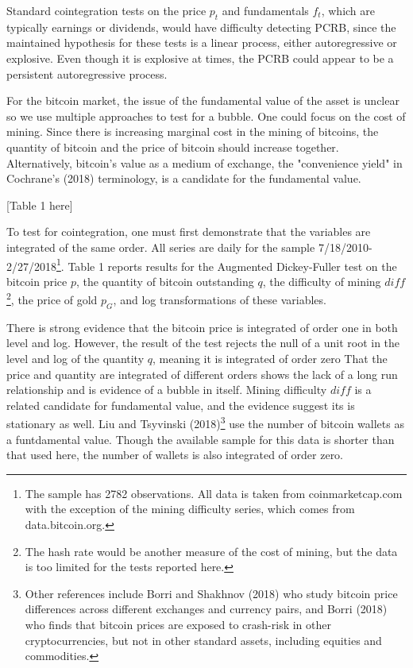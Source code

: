 \documentclass{article}
\begin{document}
Standard cointegration tests on the price $p_{t}$ and fundamentals $f_{t}$,
which are typically earnings or dividends, would have difficulty detecting
PCRB, since the maintained hypothesis for these tests is a linear process,
either autoregressive or explosive. Even though it is explosive at times,
the PCRB could appear to be a persistent autoregressive process.

For the bitcoin market, the issue of the fundamental value of the asset is
unclear so we use multiple approaches to test for a bubble. One could
focus on the cost of mining. Since there is increasing marginal cost in
the mining of bitcoins, the quantity of bitcoin and the price of bitcoin
should increase together. Alternatively, bitcoin's value as a medium of
exchange, the "convenience yield" in Cochrane's (2018) terminology, is a
candidate for the fundamental value.

\bigskip

\begin{center}
[Table 1 here]\bigskip
\end{center}

To test for cointegration, one must first demonstrate that the variables are
integrated of the same order. All series are daily for the sample
7/18/2010-2/27/2018\footnote{%
The sample has 2782 observations. All data is taken from coinmarketcap.com
with the exception of the mining difficulty series, which comes from
data.bitcoin.org.}. Table 1 reports results for the Augmented
Dickey-Fuller test on the bitcoin price $p$, the quantity of bitcoin
outstanding $q$, the difficulty of mining $diff$\footnote{%
The hash rate would be another measure of the cost of mining, but the data
is too limited for the tests reported here.}, the price of gold $p_{G}$, and
log transformations of these variables.

There is strong evidence that the bitcoin price is integrated of order one
in both level and log. However, the result of the test rejects the null of
a unit root in the level and log of the quantity $q$, meaning it is
integrated of order zero That the price and quantity are integrated of
different orders shows the lack of a long run relationship and is evidence
of a bubble in itself. Mining difficulty $diff$ is a related candidate for
fundamental value, and the evidence suggest its is stationary as well. Liu
and Tsyvinski (2018)\footnote{%
Other references include Borri and Shakhnov (2018) who study bitcoin price
differences across different exchanges and currency pairs, and Borri (2018)
who finds that bitcoin prices are exposed to crash-risk in other
cryptocurrencies, but not in other standard assets, including equities and
commodities.} use the number of bitcoin wallets as a funtdamental value.
Though the available sample for this data is shorter than that used here,
the number of wallets is also integrated of order zero.
\end{document}
